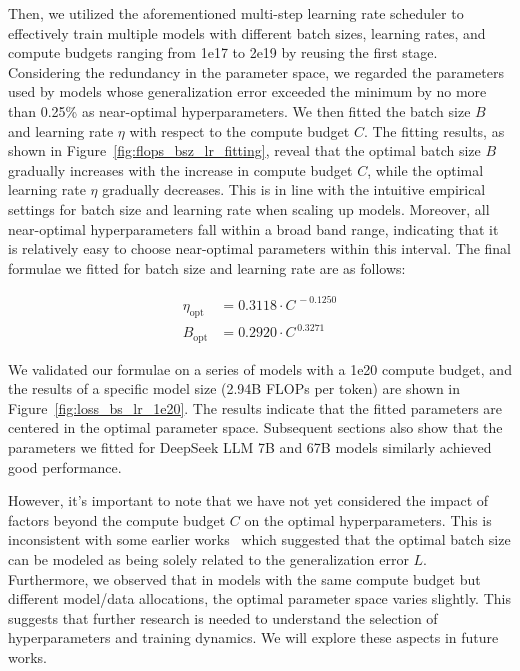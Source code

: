 Then, we utilized the aforementioned multi-step learning rate scheduler to effectively train multiple models with different batch sizes, learning rates, and compute budgets ranging from 1e17 to 2e19 by reusing the first stage. Considering the redundancy in the parameter space, we regarded the parameters used by models whose generalization error exceeded the minimum by no more than 0.25\% as near-optimal hyperparameters. We then fitted the batch size $B$ and learning rate $\eta$ with respect to the compute budget $C$. The fitting results, as shown in Figure~\ref{fig:flops_bsz_lr_fitting}, reveal that the optimal batch size $B$ gradually increases with the increase in compute budget $C$, while the optimal learning rate $\eta$ gradually decreases. This is in line with the intuitive empirical settings for batch size and learning rate when scaling up models. Moreover, all near-optimal hyperparameters fall within a broad band range, indicating that it is relatively easy to choose near-optimal parameters within this interval. The final formulae we fitted for batch size and learning rate are as follows:

\begin{equation}
\label{eqa:bsz_lr_formulae}
\begin{aligned}
    \eta_{\mathrm{opt}} &= 0.3118\cdot C^{\,-0.1250} \\
    B_{\mathrm{opt}} &= 0.2920\cdot C^{\,0.3271} 
\end{aligned}
\end{equation}

We validated our formulae on a series of models with a 1e20 compute budget, and the results of a specific model size (2.94B FLOPs per token) are shown in Figure~\ref{fig:loss_bs_lr_1e20}. The results indicate that the fitted parameters are centered in the optimal parameter space. Subsequent sections also show that the parameters we fitted for DeepSeek LLM 7B and 67B models similarly achieved good performance. 

However, it's important to note that we have not yet considered the impact of factors beyond the compute budget $C$ on the optimal hyperparameters. This is inconsistent with some earlier works~\citep{mccandlish2018empirical, scalinglaw} which suggested that the optimal batch size can be modeled as being solely related to the generalization error $L$. Furthermore, we observed that in models with the same compute budget but different model/data allocations, the optimal parameter space varies slightly. This suggests that further research is needed to understand the selection of hyperparameters and training dynamics. We will explore these aspects in future works.

